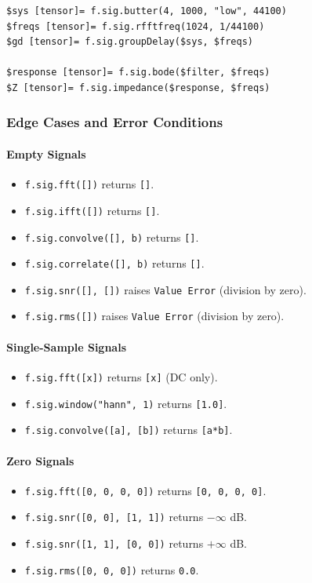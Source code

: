 \begin{verbatim}
$sys [tensor]= f.sig.butter(4, 1000, "low", 44100)
$freqs [tensor]= f.sig.rfftfreq(1024, 1/44100)
$gd [tensor]= f.sig.groupDelay($sys, $freqs)

$response [tensor]= f.sig.bode($filter, $freqs)
$Z [tensor]= f.sig.impedance($response, $freqs)
\end{verbatim}

\subsubsection{Edge Cases and Error Conditions}

\paragraph{Empty Signals}
\begin{itemize}
\item \texttt{f.sig.fft([])} returns \texttt{[]}.
\item \texttt{f.sig.ifft([])} returns \texttt{[]}.
\item \texttt{f.sig.convolve([], b)} returns \texttt{[]}.
\item \texttt{f.sig.correlate([], b)} returns \texttt{[]}.
\item \texttt{f.sig.snr([], [])} raises \texttt{Value Error} (division by zero).
\item \texttt{f.sig.rms([])} raises \texttt{Value Error} (division by zero).
\end{itemize}

\paragraph{Single-Sample Signals}
\begin{itemize}
\item \texttt{f.sig.fft([x])} returns \texttt{[x]} (DC only).
\item \texttt{f.sig.window("hann", 1)} returns \texttt{[1.0]}.
\item \texttt{f.sig.convolve([a], [b])} returns \texttt{[a*b]}.
\end{itemize}

\paragraph{Zero Signals}
\begin{itemize}
\item \texttt{f.sig.fft([0, 0, 0, 0])} returns \texttt{[0, 0, 0, 0]}.
\item \texttt{f.sig.snr([0, 0], [1, 1])} returns $-\infty$ dB.
\item \texttt{f.sig.snr([1, 1], [0, 0])} returns $+\infty$ dB.
\item \texttt{f.sig.rms([0, 0, 0])} returns \texttt{0.0}.
\end{itemize}

